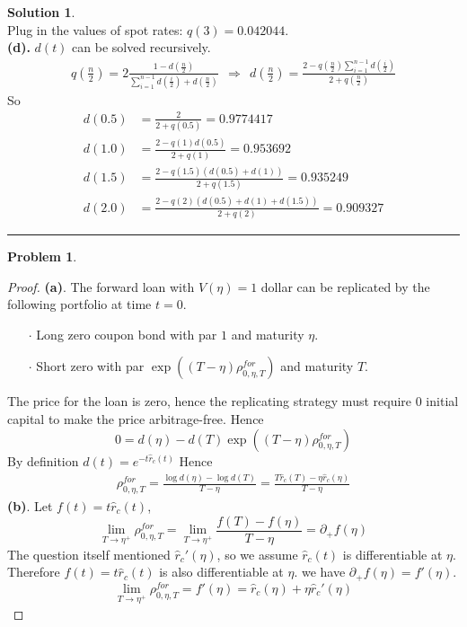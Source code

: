 \documentclass[a4paper, 10pt]{article}
\theoremstyle{definition}
\newtheorem{problem}{Problem}
\theoremstyle{hSol}
\newtheorem*{solution}{Solution}
\begin{document}
\begin{solution}
$$$$
Plug in the values of spot rates: $q(3)=0.042044$. \\
\textbf{(d).} $d(t)$ can be solved recursively.
\begin{equation}
  \begin{split}
    q(\tfrac{n}{2})=2\frac{1-d(\tfrac{n}{2})}{\sum_{i=1}^{n-1}d(\tfrac{i}{2}) + d(\tfrac{n}{2})}~~\Rightarrow~~d(\tfrac{n}{2}) = \frac{2-q(\tfrac{n}{2})\sum_{i=1}^{n-1} d(\tfrac{i}{2})}{2+q(\tfrac{n}{2})}
  \end{split}
\end{equation}
So
\begin{equation}
  \begin{split}
    d(0.5) &= \frac{2}{2+q(0.5)} = 0.9774417\\
    d(1.0) &= \frac{2-q(1)d(0.5)}{2+q(1)} = 0.953692\\
    d(1.5) &= \frac{2-q(1.5)(d(0.5)+d(1))}{2+q(1.5)} = 0.935249\\
    d(2.0) &= \frac{2-q(2)(d(0.5)+d(1)+d(1.5))}{2+q(2)} = 0.909327
  \end{split}
\end{equation}

\end{solution} 
\noindent\rule{16cm}{0.4pt}
\begin{problem} 
\end{problem}
\begin{proof} \textbf{(a)}. The forward loan with $V(\eta)=1$ dollar can be replicated by the following portfolio at time $t=0$.
\begin{itemize}
  \item[$\cdot$] Long zero coupon bond with par $1$ and maturity $\eta$.
  \item[$\cdot$] Short zero with par $\exp\left((T-\eta)\rho_{0,\eta, T}^{for}\right)$ and maturity $T$.
\end{itemize}
The price for the loan is zero, hence the replicating strategy must require $0$ initial capital to make the price arbitrage-free. Hence
$$
0 = d(\eta) - d(T)\exp\left((T-\eta)\rho_{0,\eta, T}^{for}\right)
$$
By definition $d(t)=e^{-t \hat{r}_c(t)}$ Hence
\begin{equation}
  \begin{split}
    \rho_{0,\eta, T}^{for} = \frac{\log d(\eta) - \log d(T)}{T-\eta} = \frac{T\hat{r}_c(T) - \eta\hat{r}_c(\eta)}{T-\eta}
  \end{split}
\end{equation}
\textbf{(b)}. Let $f(t) = t\hat{r}_c(t)$,
\begin{equation}
  \lim\limits_{T\rightarrow\eta^+} \rho_{0,\eta, T}^{for} = \lim\limits_{T\rightarrow\eta^+} \frac{f(T)-f(\eta)}{T-\eta} = \partial_{+}f(\eta)
\end{equation}
The question itself mentioned $\hat{r}_c'(\eta)$, so we assume $\hat{r}_c(t)$ is differentiable at $\eta$. Therefore $f(t)=t\hat{r}_c(t)$ is also differentiable at $\eta$. we have $\partial_{+}f(\eta)=f'(\eta)$.
$$
\lim\limits_{T\rightarrow\eta^+} \rho_{0,\eta, T}^{for} = f'(\eta) = \hat{r}_c(\eta) + \eta \hat{r}_c'(\eta)
$$
\end{proof}
\end{document}
